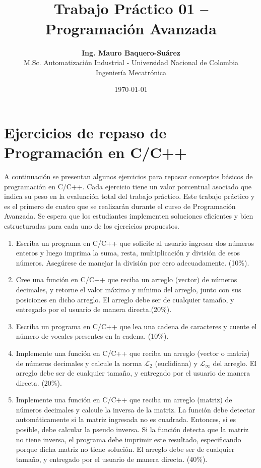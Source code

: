 \documentclass[letterpaper,11pt]{article}
\title{\Large{\vspace{.5cm}{\bf Universidad Nacional de Colombia, sede de La Paz}}\\
       \vspace{.5cm}
       \LARGE{\textbf{Trabajo Práctico 01 -- Programación Avanzada}}}
\author{
        \Large{\textbf{Ing. Mauro Baquero-Suárez}}\\
        \small{M.Sc. Automatización Industrial - Universidad Nacional de Colombia} \\
        \small{Ingeniería Mecatrónica}
}
\date{\today}
\theoremstyle{plain}
\begin{document}
\maketitle

\renewcommand{\figurename}{\textbf{Figura}}
\renewcommand{\figureautorefname}{Fig.\negthinspace}


\vspace{.5cm}

\section*{Ejercicios de repaso de Programación en C/C++}
A continuación se presentan algunos ejercicios para repasar conceptos básicos de programación en C/C++. Cada ejercicio tiene un valor porcentual asociado que indica su peso en la evaluación total del trabajo práctico. Este trabajo práctico y es el primero de cuatro que se realizarán durante el curso de Programación Avanzada. Se espera que los estudiantes implementen soluciones eficientes y bien estructuradas para cada uno de los ejercicios propuestos.
\begin{enumerate}
    \item Escriba un programa en C/C++ que solicite al usuario ingresar dos números enteros y luego imprima la suma, resta, multiplicación y división de esos números. Asegúrese de manejar la división por cero adecuadamente. (10\%).
    \item Cree una función en C/C++ que reciba un arreglo (vector) de números decimales, y retorne el valor máximo y mínimo del arreglo, junto con sus posiciones en dicho arreglo.  El arreglo debe ser de cualquier tamaño, y entregado por el usuario de manera directa.(20\%).
    \item Escriba un programa en C/C++ que lea una cadena de caracteres y cuente el número de vocales presentes en la cadena. (10\%).
    \item Implemente una función en C/C++ que reciba un arreglo (vector o matriz) de números decimales y calcule la norma $\mathcal{L}_2$ (euclidiana) y $\mathcal{L}_\infty$ del arreglo. El arreglo debe ser de cualquier tamaño, y entregado por el usuario de manera directa. (20\%).
    \item Implemente una función en C/C++ que reciba un arreglo (matriz) de números decimales y calcule la inversa de la matriz. La función debe detectar automáticamente si la matriz ingresada no es cuadrada. Entonces, si es posible, debe calcular la pseudo inversa. Si la función detecta que la matriz no tiene inversa, el programa debe imprimir este resultado, especificando porque dicha matriz no tiene solución. El arreglo debe ser de cualquier tamaño, y entregado por el usuario de manera directa. (40\%).
\end{enumerate}
\end{document}
